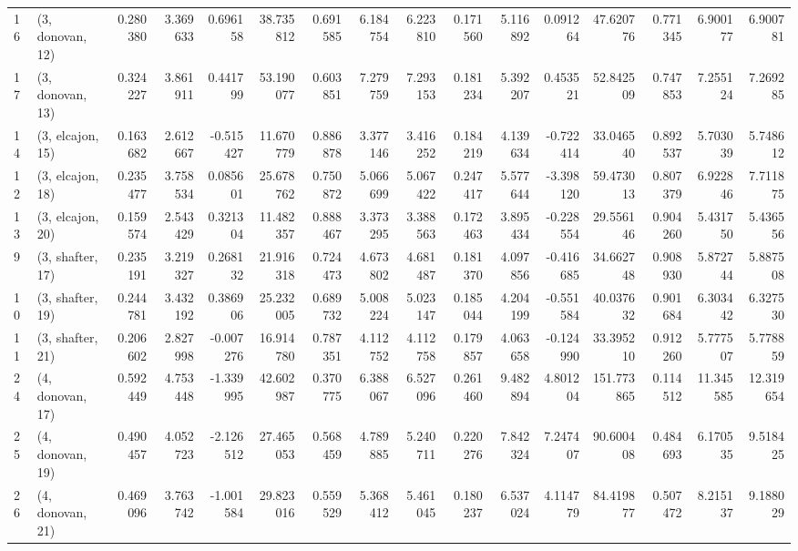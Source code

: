 \begin{tabular}{llrrrrrrrrrrrrrr}
16 &  (3, donovan, 12) &   0.280380 &  3.369633 &  0.696158 &  38.735812 &  0.691585 &   6.184754 &  6.223810 &  0.171560 &  5.116892 &  0.091264 &   47.620776 &  0.771345 &   6.900177 &   6.900781 \\
17 &  (3, donovan, 13) &   0.324227 &  3.861911 &  0.441799 &  53.190077 &  0.603851 &   7.279759 &  7.293153 &  0.181234 &  5.392207 &  0.453521 &   52.842509 &  0.747853 &   7.255124 &   7.269285 \\
14 &  (3, elcajon, 15) &   0.163682 &  2.612667 & -0.515427 &  11.670779 &  0.886878 &   3.377146 &  3.416252 &  0.184219 &  4.139634 & -0.722414 &   33.046540 &  0.892537 &   5.703039 &   5.748612 \\
12 &  (3, elcajon, 18) &   0.235477 &  3.758534 &  0.085601 &  25.678762 &  0.750872 &   5.066699 &  5.067422 &  0.247417 &  5.577644 & -3.398120 &   59.473013 &  0.807379 &   6.922846 &   7.711875 \\
13 &  (3, elcajon, 20) &   0.159574 &  2.543429 &  0.321304 &  11.482357 &  0.888467 &   3.373295 &  3.388563 &  0.172463 &  3.895434 & -0.228554 &   29.556146 &  0.904260 &   5.431750 &   5.436556 \\
9  &  (3, shafter, 17) &   0.235191 &  3.219327 &  0.268132 &  21.916318 &  0.724473 &   4.673802 &  4.681487 &  0.181370 &  4.097856 & -0.416685 &   34.662748 &  0.908930 &   5.872744 &   5.887508 \\
10 &  (3, shafter, 19) &   0.244781 &  3.432192 &  0.386906 &  25.232005 &  0.689732 &   5.008224 &  5.023147 &  0.185044 &  4.204199 & -0.551584 &   40.037632 &  0.901684 &   6.303442 &   6.327530 \\
11 &  (3, shafter, 21) &   0.206602 &  2.827998 & -0.007276 &  16.914780 &  0.787351 &   4.112752 &  4.112758 &  0.179857 &  4.063658 & -0.124990 &   33.395210 &  0.912260 &   5.777507 &   5.778859 \\
24 &  (4, donovan, 17) &   0.592449 &  4.753448 & -1.339995 &  42.602987 &  0.370775 &   6.388067 &  6.527096 &  0.261460 &  9.482894 &  4.801204 &  151.773865 &  0.114512 &  11.345585 &  12.319654 \\
25 &  (4, donovan, 19) &   0.490457 &  4.052723 & -2.126512 &  27.465053 &  0.568459 &   4.789885 &  5.240711 &  0.220276 &  7.842324 &  7.247407 &   90.600408 &  0.484693 &   6.170535 &   9.518425 \\
26 &  (4, donovan, 21) &   0.469096 &  3.763742 & -1.001584 &  29.823016 &  0.559529 &   5.368412 &  5.461045 &  0.180237 &  6.537024 &  4.114779 &   84.419877 &  0.507472 &   8.215137 &   9.188029 \\

\end{tabular}
